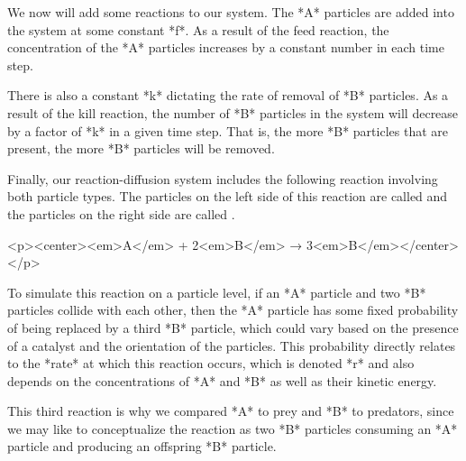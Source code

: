 \begin{qbox}\end{qbox}

We now will add some reactions to our system. The *A* particles are added into the system at some constant  *f*. As a result of the feed reaction, the concentration of the *A* particles increases by a constant number in each time step.

\begin{note}\end{note}

There is also a  constant *k* dictating the rate of removal of *B* particles. As a result of the kill reaction, the number of *B* particles in the system will decrease by a factor of *k* in a given time step. That is, the more *B* particles that are present, the more *B* particles will be removed.

Finally, our reaction-diffusion system includes the following reaction involving both particle types. The particles on the left side of this reaction are called  and the particles on the right side are called .

<p><center><em>A</em> + 2<em>B</em> → 3<em>B</em></center></p>

To simulate this reaction on a particle level, if an *A* particle and two *B* particles collide with each other, then the *A* particle has some fixed probability of being replaced by a third *B* particle, which could vary based on the presence of a catalyst and the orientation of the particles. This probability directly relates to the *rate* at which this reaction occurs, which is denoted *r* and also depends on the concentrations of *A* and *B* as well as their kinetic energy.

This third reaction is why we compared *A* to prey and *B* to predators, since we may like to conceptualize the reaction as two *B* particles consuming an *A* particle and producing an offspring *B* particle.

